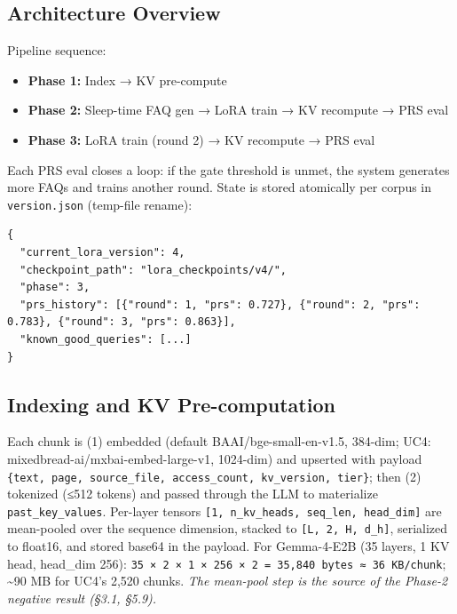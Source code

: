 \hypertarget{architecture-overview}{%
\subsection{Architecture Overview}\label{architecture-overview}}

Pipeline sequence:

\begin{itemize}
\tightlist
\item
  \textbf{Phase 1:} Index → KV pre-compute
\item
  \textbf{Phase 2:} Sleep-time FAQ gen → LoRA train → KV recompute → PRS eval
\item
  \textbf{Phase 3:} LoRA train (round 2) → KV recompute → PRS eval
\end{itemize}

Each PRS eval closes a loop: if the gate threshold is unmet, the system generates more FAQs and trains another round. State is stored atomically per corpus in \texttt{version.json} (temp-file rename):

\begin{verbatim}
{
  "current_lora_version": 4,
  "checkpoint_path": "lora_checkpoints/v4/",
  "phase": 3,
  "prs_history": [{"round": 1, "prs": 0.727}, {"round": 2, "prs": 0.783}, {"round": 3, "prs": 0.863}],
  "known_good_queries": [...]
}
\end{verbatim}

\hypertarget{indexing-and-kv-pre-computation}{%
\subsection{Indexing and KV Pre-computation}\label{indexing-and-kv-pre-computation}}

Each chunk is (1) embedded (default BAAI/bge-small-en-v1.5, 384-dim; UC4: mixedbread-ai/mxbai-embed-large-v1, 1024-dim) and upserted with payload \texttt{\{text,\ page,\ source\_file,\ access\_count,\ kv\_version,\ tier\}}; then (2) tokenized (≤512 tokens) and passed through the LLM to materialize \texttt{past\_key\_values}. Per-layer tensors \texttt{{[}1,\ n\_kv\_heads,\ seq\_len,\ head\_dim{]}} are mean-pooled over the sequence dimension, stacked to \texttt{{[}L,\ 2,\ H,\ d\_h{]}}, serialized to float16, and stored base64 in the payload. For Gemma-4-E2B (35 layers, 1 KV head, head\_dim 256): \texttt{35\ ×\ 2\ ×\ 1\ ×\ 256\ ×\ 2\ =\ 35,840\ bytes\ ≈\ 36\ KB/chunk}; \textasciitilde90 MB for UC4's 2,520 chunks. \emph{The mean-pool step is the source of the Phase-2 negative result (§3.1, §5.9).}

